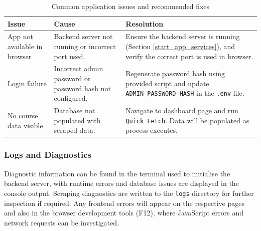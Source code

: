 \begin{table}[h]
\centering
\begin{tabularx}{\textwidth}{@{} p{2.5cm} p{5cm} X @{}}
\toprule
\textbf{Issue} & \textbf{Cause} & \textbf{Resolution} \\
\midrule

App not available in browser & Backend server not running or incorrect port used. & Ensure the backend server is running (Section \ref{start_app_services}), and verify the correct port is used in browser. \\

Login failure & Incorrect admin password or password hash not configured. & Regenerate password hash using provided script and update \texttt{ADMIN\_PASSWORD\_HASH} in the \texttt{.env} file. \\

No course data visible & Database not populated with scraped data. & Navigate to dashboard page and run \texttt{Quick Fetch}. Data will be populated as process executes. \\

\bottomrule
\end{tabularx}
\caption{Common application issues and recommended fixes}
\end{table}
\vspace{-20pt}

\subsubsection{Logs and Diagnostics}

Diagnostic information can be found in the terminal used to initialise the backend server, with runtime errors and database issues are displayed in the console output. Scraping diagnostics are written to the \texttt{logs} directory for further inspection if required. Any frontend errors will appear on the respective pages and also in the browser development tools (F12), where JavaScript errors and network requests can be investigated. 